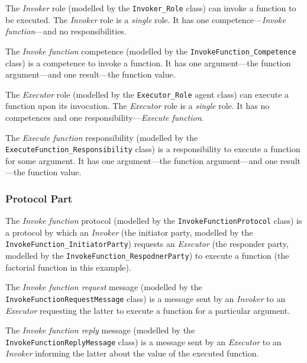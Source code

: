 The \textit{Invoker} role (modelled by the \texttt{Invoker\_Role} class) can invoke a function to be executed.
The \textit{Invoker} role is a \textit{single} role.
It has one competence---\textit{Invoke function}---and no responsibilities.

The \textit{Invoke function} competence (modelled by the \texttt{InvokeFunction\_Competence} class) is a competence to invoke a function.
It has one argument---the function argument---and one result---the function value.

The \textit{Executor} role (modelled by the \texttt{Executor\_Role} agent class) can execute a function upon its invocation.
The \textit{Executor} role is a \textit{single} role.
It has no competences and one responsibility---\textit{Execute function}.

The \textit{Execute function} responsibility (modelled by the \texttt{ExecuteFunction\_Responsibility} class) is a responsibility to execute a function for some argument.
It has one argument---the function argument---and one result---the function value.

\subsubsection*{Protocol Part}

The \textit{Invoke function} protocol (modelled by the \texttt{InvokeFunctionProtocol} class) is a protocol by which an \textit{Invoker} (the initiator party, modelled by the \texttt{InvokeFunction\_InitiatorParty}) requests an \textit{Executor} (the responder party, modelled by the \texttt{InvokeFunction\_RespodnerParty}) to execute a function (the factorial function in this example).

The \textit{Invoke function request} message (modelled by the \texttt{InvokeFunctionRequestMessage} class) is a message sent by an \textit{Invoker} to an \textit{Executor} requesting the latter to execute a function for a particular argument.

The \textit{Invoke function reply} message (modelled by the \texttt{InvokeFunctionReplyMessage} class) is a message sent by an \textit{Executor} to an \textit{Invoker} informing the latter about the value of the executed function.

